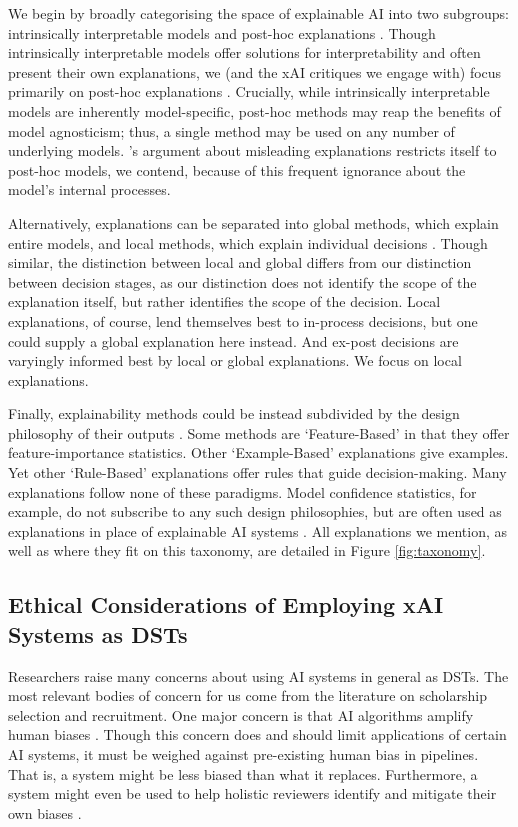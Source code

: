 We begin by broadly categorising the space of explainable AI into two subgroups: intrinsically interpretable models and post-hoc explanations \cite{molnar_interpretable_2019}. Though intrinsically interpretable models offer solutions for interpretability and often present their own explanations, we (and the xAI critiques we engage with) focus primarily on post-hoc explanations \cite{molnar_interpretable_2019}. Crucially, while intrinsically interpretable models are inherently model-specific, post-hoc methods may reap the benefits of model agnosticism; thus, a single method may be used on any number of underlying models. \textcite{Lipton}'s argument about misleading explanations restricts itself to post-hoc models, we contend, because of this frequent ignorance about the model's internal processes.

Alternatively, explanations can be separated into global methods, which explain entire models, and local methods, which explain individual decisions \cite{molnar_interpretable_2019}. Though similar, the distinction between local and global differs from our distinction between decision stages, as our distinction does not identify the scope of the explanation itself, but rather identifies the scope of the decision. Local explanations, of course, lend themselves best to in-process decisions, but one could supply a global explanation here instead. And ex-post decisions are varyingly informed best by local or global explanations. We focus on local explanations.

Finally, explainability methods could be instead subdivided by the design philosophy of their outputs \cite{friedrich_taxonomy_2011}. Some methods are `Feature-Based' in that they offer feature-importance statistics. Other `Example-Based' explanations give examples. Yet other `Rule-Based' explanations offer rules that guide decision-making. Many explanations follow none of these paradigms. Model confidence statistics, for example, do not subscribe to any such design philosophies, but are often used as explanations in place of explainable AI systems \cite{zhang_effect_2020}. All explanations we mention, as well as where they fit on this taxonomy, are detailed in Figure \ref{fig:taxonomy}.

\subsection{Ethical Considerations of Employing xAI Systems as DSTs}
Researchers raise many concerns about using AI systems in general as DSTs. The most relevant bodies of concern for us come from the literature on scholarship selection and recruitment. One major concern is that AI algorithms amplify human biases \cite{MikePerkins_JasperRoe_2023}. Though this concern does and should limit applications of certain AI systems, it must be weighed against pre-existing human bias in pipelines. That is, a system might be less biased than what it replaces. Furthermore, a system might even be used to help holistic reviewers identify and mitigate their own biases \cite{alvero_ai_2020}.

